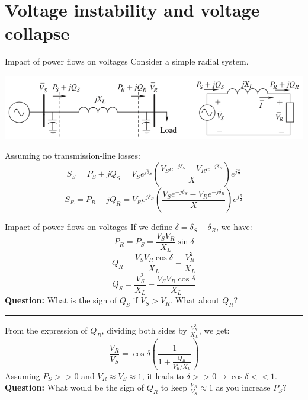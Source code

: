 \section{Voltage instability and voltage collapse}

\begin{frame}{Impact of power flows on voltages}
Consider a simple radial system.
\vspace{0.5cm}
\begin{center}
\includegraphics[width=\textwidth]{images/RadialSystem.png}
\end{center}
Assuming no transmission-line losses:
$$S_S = P_S + jQ_S = V_S e^{j \delta_S} \left(\frac{V_S e^{-j \delta_S} - V_R e^{-j \delta_R}}{X}\right) e^{j\frac{\pi}{2}}$$
$$S_R = P_R + jQ_R = V_R e^{j \delta_R} \left(\frac{V_S e^{-j \delta_S} - V_R e^{-j \delta_R}}{X}\right) e^{j\frac{\pi}{2}}$$
\end{frame}

\begin{frame}{Impact of power flows on voltages}
If we define $\delta = \delta_S-\delta_R$, we have:
$$P_R = P_S = \frac{V_S V_R}{X_L}\sin \delta$$
$$Q_{R} = \frac{V_S V_R \cos \delta}{X_L} - \frac{V^2_R}{X_L}$$
$$Q_{S} = \frac{V_S^2}{X_L} - \frac{V_S V_R \cos \delta}{X_L}$$
\textbf{Question:} What is the sign of $Q_S$ if $V_S>V_R$. What about $Q_R$?
\hrule
From the expression of $Q_{R}$, dividing both sides by $\frac{V_R^2}{X_L}$, we get:
$$\frac{V_R}{V_S} = \cos \delta \left(\frac{1}{1+\frac{Q_R}{V^2_R/X_L}}\right)$$
Assuming $P_S>>0$ and $V_R \approx V_S \approx 1$, it leads to $\delta >> 0 \rightarrow \cos \delta << 1$.
\textbf{Question:} What would be the sign of $Q_R$ to keep $\frac{V_R}{V_S}\approx 1$ as you increase $P_S$?
\end{frame}

